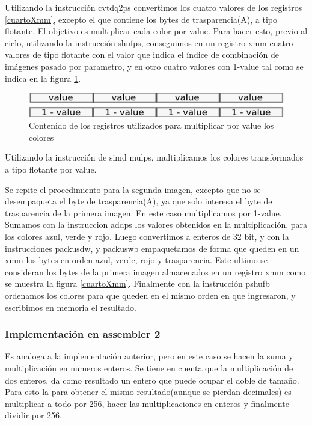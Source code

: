 \documentclass[a4paper]{article}
\begin{document}
Utilizando la instrucción cvtdq2ps convertimos los cuatro valores de los registros \ref{cuartoXmm}, excepto el que contiene los bytes de trasparencia(A), a tipo flotante. El objetivo es multiplicar cada color por value. Para hacer esto, previo al ciclo, utilizando la instrucción shufps, conseguimos en un registro xmm cuatro valores de tipo flotante con el valor que indica el índice de combinación de imágenes pasado por parametro, y en otro cuatro valores con 1-value tal como se indica en la figura \ref{value}.

\begin{figure}[H]
\centering
\includegraphics[scale=0.8]{imagenes/value.png}
\caption{Contenido de los registros utilizados para multiplicar por value los colores}
\label{value}
\end{figure}


Utilizando la instrucción de simd mulps, multiplicamos los colores transformados a tipo flotante por value.

Se repite el procedimiento para la segunda imagen, excepto que no se desempaqueta el byte de trasparencia(A), ya que solo interesa el byte de trasparencia de la primera imagen. En este caso multiplicamos por 1-value. Sumamos con la instruccion addps los valores obtenidos en la multiplicación, para los colores azul, verde y rojo. Luego convertimos a enteros de 32 bit, y con la instrucciones packusdw, y packuswb empaquetamos de forma que queden en un xmm los bytes en orden azul, verde, rojo y trasparencia. Este ultimo se consideran los bytes de la primera imagen almacenados en un registro xmm como se muestra la figura \ref{cuartoXmm}. Finalmente con la instrucción pshufb ordenamos los colores para que queden en el mismo orden en que ingresaron, y escribimos en memoria el resultado.

\subsubsection{Implementación en assembler 2}

Es analoga a la implementación anterior, pero en este caso se hacen la suma y multiplicación en numeros enteros. Se tiene en cuenta que la multiplicación de dos enteros, da como resultado un entero que puede ocupar el doble de tamaño. Para esto la para obtener el mismo resultado(aunque se pierdan decimales) es multiplicar a todo por 256, hacer las multiplicaciones en enteros y finalmente dividir por 256.
\end{document}
